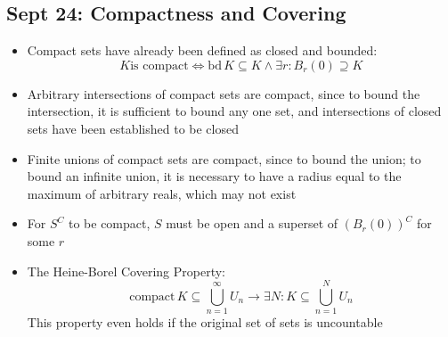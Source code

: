 \documentclass[10pt, oneside]{article}
\begin{document}
\subsection{Sept 24: Compactness and Covering}
\begin{itemize}
    \item Compact sets have already been defined as closed and bounded:
        \[K \text{is compact} \Leftrightarrow \text{bd} \, K \subseteq K \land \exists r : B_{r}(0) \supseteq K \]
    \item Arbitrary intersections of compact sets are compact, since to bound the intersection, it is sufficient to bound any one set, and intersections of closed sets have been established to be closed
    \item Finite unions of compact sets are compact, since to bound the union; to bound an infinite union, it is necessary to have a radius equal to the maximum of arbitrary reals, which may not exist
    \item For $S^C$ to be compact, $S$ must be open and a superset of $(B_r(0))^C$ for some $r$
    \item The Heine-Borel Covering Property:
        \[\text{compact} \, K \subseteq \bigcup_{n=1}^\infty U_n \rightarrow \exists N : K \subseteq \bigcup_{n=1}^N U_n\]
    This property even holds if the original set of sets is uncountable
\end{itemize}
\end{document}
